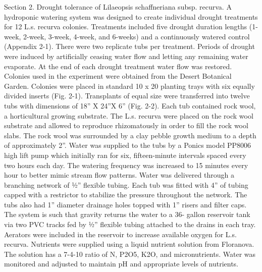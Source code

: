 \documentclass[twocolumn]{article}
\begin{document}
Section 2. Drought tolerance of Lilaeopsis schaffneriana subsp. recurva.
A hydroponic watering system was designed to create individual drought treatments for 12 L.s. recurva colonies. Treatments included five drought duration lengths (1-week, 2-week, 3-week, 4-week, and 6-weeks) and a continuously watered control (Appendix 2-1). There were two replicate tubs per treatment. Periods of drought were induced by artificially ceasing water flow and letting any remaining water evaporate. At the end of each drought treatment water flow was restored. Colonies used in the experiment were obtained from the Desert Botanical Garden. Colonies were placed in standard 10 x 20 planting trays with six equally divided inserts (Fig. 2-1). Transplants of equal size were transferred into twelve tubs with dimensions of 18” X 24”X 6” (Fig. 2-2).  Each tub contained rock wool, a horticultural growing substrate. The L.s. recurva were placed on the rock wool substrate and allowed to reproduce rhizomatously in order to fill the rock wool slabs. The rock wool was surrounded by a clay pebble growth medium to a depth of approximately 2”. Water was supplied to the tubs by a Ponics model PP8006 high lift pump which initially ran for six, fifteen-minute intervals spaced every two hours each day. The watering frequency was increased to 15 minutes every hour to better mimic stream flow patterns. Water was delivered through a branching network of ½” flexible tubing. Each tub was fitted with 4” of tubing capped with a restrictor to stabilize the pressure throughout the network. The tubs also had 1” diameter drainage holes topped with 1” risers and filter caps. The system is such that gravity returns the water to a 36- gallon reservoir tank via two PVC tracks fed by ½” flexible tubing attached to the drains in each tray. Aerators were included in the reservoir to increase available oxygen for L.s. recurva. Nutrients were supplied using a liquid nutrient solution from Floranova. The solution has a 7-4-10 ratio of N, P2O5, K2O, and micronutrients. Water was monitored and adjusted to maintain pH and appropriate levels of nutrients. 
\end{document}
